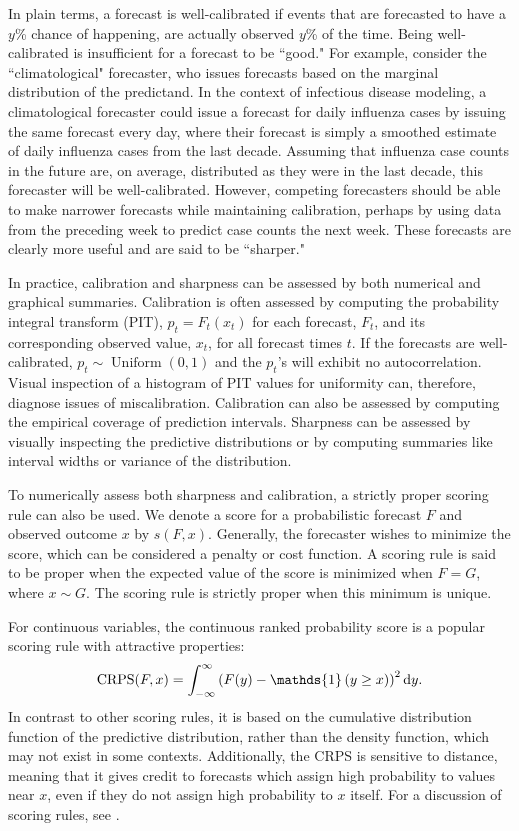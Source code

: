 In plain terms, a forecast is well-calibrated if events that are forecasted to have a \( y \)\% chance of happening, are actually observed \( y \)\% of the time.
Being well-calibrated is insufficient for a forecast to be ``good."
For example, consider the ``climatological" forecaster, who issues forecasts based on the marginal distribution of the predictand.
In the context of infectious disease modeling, a climatological forecaster could issue a forecast for daily influenza cases by issuing the same forecast every day, where their forecast is simply a smoothed estimate of daily influenza cases from the last decade.
Assuming that influenza case counts in the future are, on average, distributed as they were in the last decade, this forecaster will be well-calibrated.
However, competing forecasters should be able to make narrower forecasts while maintaining calibration, perhaps by using data from the preceding week to predict case counts the next week.
These forecasts are clearly more useful and are said to be ``sharper."

In practice, calibration and sharpness can be assessed by both numerical and graphical summaries.
Calibration is often assessed by computing the probability integral transform (PIT), \( p_t = F_t(x_t) \) for each forecast, \( F_t \), and its corresponding observed value, \( x_t \), for all forecast times \( t \).
If the forecasts are well-calibrated, \( p_t \sim \operatorname{Uniform}(0,1) \) and the \( p_t \)'s will exhibit no autocorrelation.
Visual inspection of a histogram of PIT values for uniformity can, therefore, diagnose issues of miscalibration.
Calibration can also be assessed by computing the empirical coverage of prediction intervals.
Sharpness can be assessed by visually inspecting the predictive distributions or by computing summaries like interval widths or variance of the distribution.

To numerically assess both sharpness and calibration, a strictly proper scoring rule can also be used.
We denote a score for a probabilistic forecast \( F \) and observed outcome \( x \) by \( s(F, x) \).
Generally, the forecaster wishes to minimize the score, which can be considered a penalty or cost function.
A scoring rule is said to be proper when the expected value of the score is minimized when \( F = G \), where $x \sim G$.
The scoring rule is strictly proper when this minimum is unique.

For continuous variables, the continuous ranked probability score is a popular scoring rule with attractive properties:
\begin{equation}
    \operatorname{CRPS}(F, x) = \int_{-\infty}^{\infty} \left( F(y) - \mathds{1} \left( y \geq x \right) \right)^2 \rmd y.
    \label{ch_2:eqn:crps}
\end{equation}
In contrast to other scoring rules, it is based on the cumulative distribution function of the predictive distribution, rather than the density function, which may not exist in some contexts.
Additionally, the CRPS is sensitive to distance, meaning that it gives credit to forecasts which assign high probability to values near \( x \), even if they do not assign high probability to \( x \) itself.
For a discussion of scoring rules, see \citep{gneiting2007strictly}.

